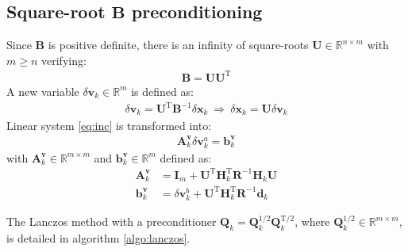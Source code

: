 \documentclass[12pt]{scrartcl}
\begin{document}
\FloatBarrier

\subsection{Square-root $\mathbf{B}$ preconditioning}
Since $\mathbf{B}$ is positive definite, there is an infinity of square-roots $\mathbf{U} \in \mathbb{R}^{n \times m}$ with $m \ge n$ verifying:
\begin{align}
\mathbf{B} = \mathbf{U} \mathbf{U}^\mathrm{T}
\end{align}
A new variable $\delta \mathbf{v}_k \in \mathbb{R}^m$ is defined as:
\begin{align}
\delta \mathbf{v}_k = \mathbf{U}^\mathrm{T} \mathbf{B}^{-1} \delta \mathbf{x}_k \ \Rightarrow \ \delta \mathbf{x}_k = \mathbf{U} \delta \mathbf{v}_k
\end{align}
Linear system \eqref{eq:inc} is transformed into:
\begin{align}
\label{eq:inc_U}
\boxed{\mathbf{A}^\mathbf{v}_k \delta \mathbf{v}^a_k = \mathbf{b}^\mathbf{v}_k}
\end{align}
with $\mathbf{A}^\mathbf{v}_k \in \mathbb{R}^{m \times m}$ and $\mathbf{b}^\mathbf{v}_k \in \mathbb{R}^{m}$ defined as:
\begin{align}
\mathbf{A}^\mathbf{v}_k & = \mathbf{I}_m + \mathbf{U}^\mathrm{T} \mathbf{H}_k^\mathrm{T} \mathbf{R}^{-1} \mathbf{H}_k \mathbf{U} \\
\mathbf{b}^\mathbf{v}_k & = \delta \mathbf{v}^b_k + \mathbf{U}^\mathrm{T} \mathbf{H}_k^\mathrm{T} \mathbf{R}^{-1} \mathbf{d}_k
\end{align}

The Lanczos method with a preconditioner $\mathbf{Q}_k = \mathbf{Q}_k^{1/2} \mathbf{Q}_k^{\mathrm{T}/2}$, where $\mathbf{Q}_k^{1/2} \in \mathbb{R}^{m \times m}$, is detailed in algorithm \ref{algo:lanczos}.\\
\end{document}
